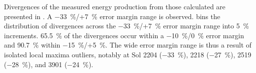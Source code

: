 Divergences of the measured energy production from those calculated are presented in . A \SI{-33}{\percent}/+\SI{7}{\percent} error margin range is observed.  bins the distribution of divergences across the \SI{-33}{\percent}/+\SI{7}{\percent} error margin range into \SI{5}{\percent} increments. \SI{65.5}{\percent} of the divergences occur within a \SI{-10}{\percent}/\SI{0}{\percent} error margin and \SI{90.7}{\percent} within \SI{-15}{\percent}/+\SI{5}{\percent}. The wide error margin range is thus a result of isolated local maxima outliers, notably at Sol 2204 (\SI{-33}{\percent}), 2218 (\SI{-27}{\percent}), 2519 (\SI{-28}{\percent}), and 3901 (\SI{-24}{\percent}).

\vspace{1cm}

